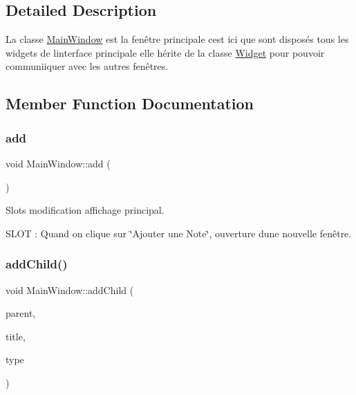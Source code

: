 \subsection{Detailed Description}
La classe \hyperlink{classMainWindow}{Main\+Window} est la fenêtre principale c\textquotesingle{}est ici que sont disposés tous les widgets de l\textquotesingle{}interface principale elle hérite de la classe \hyperlink{classWidget}{Widget} pour pouvoir communiiquer avec les autres fenêtres. 

\subsection{Member Function Documentation}
\mbox{\label{classMainWindow_a25d69f74e563bb6df70d8b67cba8d794}} 
\subsubsection{\texorpdfstring{add}{add}}
{\footnotesize\ttfamily void Main\+Window\+::add (\begin{DoxyParamCaption}{ }\end{DoxyParamCaption})\hspace{0.3cm}{\ttfamily [slot]}}



Slots modification affichage principal. 

S\+L\+OT \+: Quand on clique sur \char`\"{}\+Ajouter une Note\char`\"{}, ouverture d\textquotesingle{}une nouvelle fenêtre. \mbox{\label{classMainWindow_a34eb6cdb9e565f9455e54ba5e1f3c434}} 
\subsubsection{\texorpdfstring{add\+Child()}{addChild()}}
{\footnotesize\ttfamily void Main\+Window\+::add\+Child (\begin{DoxyParamCaption}\item[{Q\+Tree\+Widget\+Item $\ast$}]{parent,  }\item[{Q\+String}]{title,  }\item[{Q\+String}]{type }\end{DoxyParamCaption})\hspace{0.3cm}{\ttfamily [static]}}



